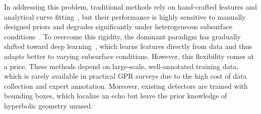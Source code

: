 \documentclass[lettersize,journal]{IEEEtran}
\begin{document}

In addressing this problem, traditional methods rely on hand-crafted features and analytical curve fitting~\cite{travassos2021review}, but their performance is highly sensitive to manually designed priors and degrades significantly under heterogeneous subsurface conditions~\cite{tong2020survey}. 
To overcome this rigidity, the dominant paradigm has gradually shifted toward deep learning~\cite{besaw2015deep,redmon2016yolo}, which learns features directly from data and thus adapts better to varying subsurface conditions.
However, this flexibility comes at a price. These methods depend on large-scale, well-annotated training data, which is rarely available in practical GPR surveys due to the high cost of data collection and expert annotation.
Moreover, existing detectors are trained with bounding boxes, which localize an echo but leave the prior knowledge of hyperbolic geometry unused. 
\end{document}
